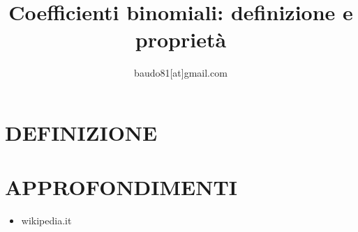 \documentclass[a4paper,10pt]{article}
\title{Coefficienti binomiali: definizione e proprietà}
\author{baudo81[at]gmail.com}
\begin{document}
\maketitle

\section{DEFINIZIONE}

\section{APPROFONDIMENTI}
\begin{itemize}
 \item wikipedia.it \cite{coefbin}
\end{itemize}




 

\end{document}
